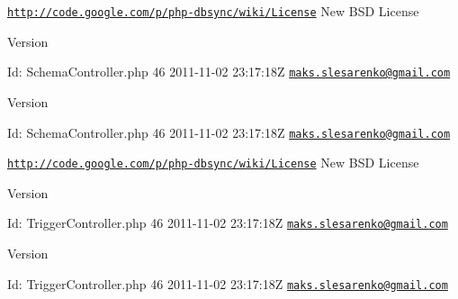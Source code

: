 \href{http://code.google.com/p/php-dbsync/wiki/License}{\tt http://code.google.com/p/php-\/dbsync/wiki/License} New BSD License \begin{DoxyVersion}{Version}

\end{DoxyVersion}
\begin{DoxyParagraph}{Id:}
SchemaController.php 46 2011-\/11-\/02 23:17:18Z \href{mailto:maks.slesarenko@gmail.com}{\tt maks.slesarenko@gmail.com} 
\end{DoxyParagraph}


\begin{DoxyVersion}{Version}

\end{DoxyVersion}
\begin{DoxyParagraph}{Id:}
SchemaController.php 46 2011-\/11-\/02 23:17:18Z \href{mailto:maks.slesarenko@gmail.com}{\tt maks.slesarenko@gmail.com} 
\end{DoxyParagraph}


\href{http://code.google.com/p/php-dbsync/wiki/License}{\tt http://code.google.com/p/php-\/dbsync/wiki/License} New BSD License \begin{DoxyVersion}{Version}

\end{DoxyVersion}
\begin{DoxyParagraph}{Id:}
TriggerController.php 46 2011-\/11-\/02 23:17:18Z \href{mailto:maks.slesarenko@gmail.com}{\tt maks.slesarenko@gmail.com} 
\end{DoxyParagraph}


\begin{DoxyVersion}{Version}

\end{DoxyVersion}
\begin{DoxyParagraph}{Id:}
TriggerController.php 46 2011-\/11-\/02 23:17:18Z \href{mailto:maks.slesarenko@gmail.com}{\tt maks.slesarenko@gmail.com} 
\end{DoxyParagraph}
